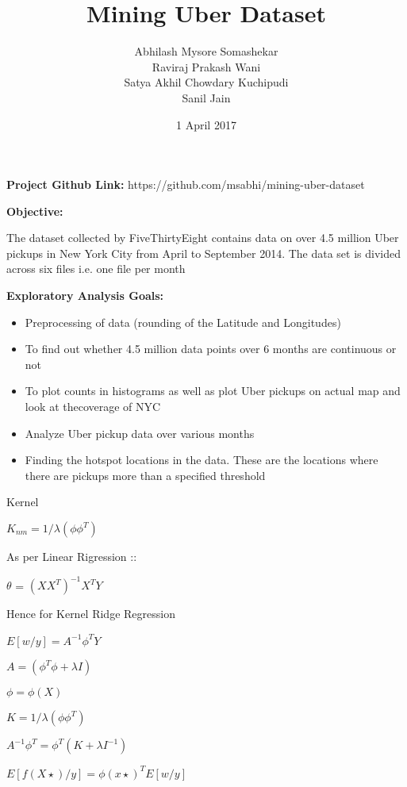 \documentclass[12pt]{article}
\begin{document}
\begin{titlepage}
\title{Mining Uber Dataset}
\author{Abhilash Mysore Somashekar \\Raviraj Prakash Wani \\ Satya Akhil Chowdary Kuchipudi \\Sanil Jain}
\date{1 April 2017}
\maketitle
\end{titlepage}
\textbf{Project Github Link:} https://github.com/msabhi/mining-uber-dataset


\textbf{Objective:}

The dataset collected by FiveThirtyEight contains data on over 4.5 million Uber pickups in New York City from April to September 2014. The data set is divided across six files i.e. one file per month

\textbf{Exploratory Analysis Goals:}

\begin{itemize}
	\item Preprocessing of data (rounding of the Latitude and Longitudes)
	\item To find out whether 4.5 million data points over 6 months are continuous or not
	\item To plot counts in histograms as well as plot Uber pickups on actual map and look at thecoverage of NYC
	\item Analyze Uber pickup data over various months
	\item Finding the hotspot locations in the data. These are the locations where there are pickups more than a specified threshold
\end{itemize}

Kernel \\
\begin{center}
$K_{nm} = 1/\lambda \left ( \phi \phi ^{T} \right )$ \break
\end{center}

As per Linear Rigression :: \\

\begin{center}
\(\theta\)   = $(XX^{T})^{-1}X^{T}Y$
\end{center}

Hence for Kernel Ridge Regression \\

\begin{center}

$E\left [w/y  \right ] =  A^{-1}\phi ^{T}Y$\ \break
                      
$A = (\phi^{T} \phi + \lambda I )$ \break

$\phi =  \phi \left ( X \right )$ \break

$K = 1/\lambda \left ( \phi \phi ^{T} \right )$ \break

$A^{-1}\phi ^{T} = \phi ^{T}\left ( K + \lambda I^{-1} \right )$ \break

$E\left [ f\left ( X\star  \right )/y \right ] = \phi \left ( x\star  \right )^{T}E\left [ w/y \right ]$

\end{center}
\end{document}

